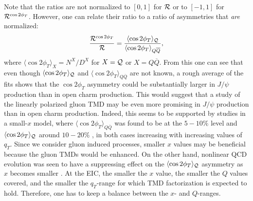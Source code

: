 \documentclass[prd,aps,preprintnumbers,nofootinbib,superscriptaddress]{revtex4}
\newcommand{\sT}{{\scriptscriptstyle T}}
\begin{document}
Note that the ratios are not normalized to $[0,1]$ for ${\cal R}$ or to $[-1,1]$ for ${\cal R}^{\cos2\phi_\sT}$. However, one can relate their ratio to a ratio of asymmetries that {\it are} normalized:
\begin{align}
\frac{{\cal R}^{\cos 2 \phi_T}}{{\cal R}} = \frac{\langle \cos 2\phi_T \rangle_{{\cal Q}}}{\langle \cos 2\phi_T \rangle_{Q\overline{Q}}},
\end{align}
where $\langle \cos 2\phi_T \rangle_X = N^X/D^X$ for $X={\cal Q}$ or $X=Q\overline{Q}$.
From this one can see  that even though $\langle \cos 2\phi_T \rangle_{{\cal Q}}$ and $\langle \cos 2\phi_T \rangle_{Q\overline{Q}}$ are not known, a rough average of the fits shows that the $\cos 2\phi_T$ asymmetry could be substantially larger
in $J/\psi$ production than in open charm production. This would suggest that a study of the linearly polarized gluon TMD may be even more promising in $J/\psi$ production than in open charm production. Indeed, this seems to be supported by studies in a small-$x$ model, where $\langle \cos 2\phi_T \rangle_{Q\overline{Q}}$ was found to be at the $5-10\%$ level \cite{Boer:2016fqd} and $\langle \cos 2\phi_T \rangle_{{\cal Q}}$ around $10-20\%$ \cite{Bacchetta:2018ivt}, in both cases increasing with increasing values of $q_\sT$. Since we consider gluon induced processes, smaller $x$ values may be beneficial because the gluon TMDs would be enhanced. On the other hand, nonlinear QCD evolution was seen to have a suppressing effect on the $\langle \cos 2\phi_T \rangle_{{\cal Q}}$ asymmetry as $x$ becomes smaller \cite{Bacchetta:2018ivt}. At the EIC, the smaller the $x$ value, the smaller the $Q$ values covered, and the smaller the $q_\sT$-range for which TMD factorization is expected to hold. Therefore, one has to keep a balance between the $x$- and $Q$-ranges.
\end{document}
